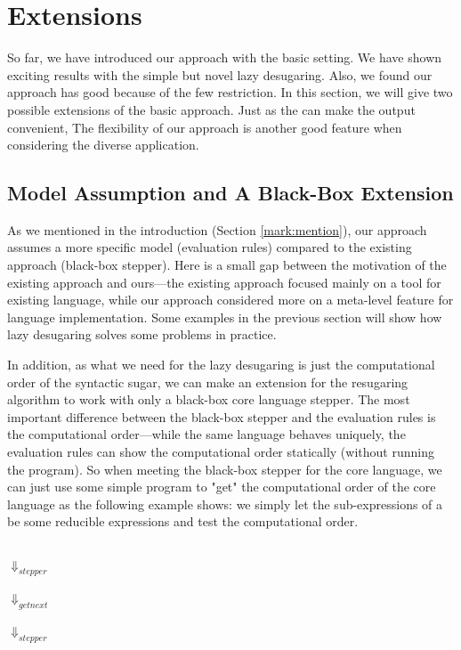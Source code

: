 \section{Extensions}
\label{sec:ext}

So far, we have introduced our approach with the basic setting. We have shown exciting results with the simple but novel lazy desugaring. Also, we found our approach has good because of the few restriction. In this section, we will give two possible extensions of the basic approach. Just as the  can make the output convenient, The flexibility of our approach is another good feature when considering the diverse application.

\subsection{Model Assumption and A Black-Box Extension}


As we mentioned in the introduction (Section \ref{mark:mention}), our approach assumes a more specific model (evaluation rules) compared to the existing approach (black-box stepper). Here is a small gap between the motivation of the existing approach and ours---the existing approach focused mainly on a tool for existing language, while our approach considered more on a meta-level feature for language implementation. Some examples in the previous section will show how lazy desugaring solves some problems in practice.

In addition, as what we need for the lazy desugaring is just the computational order of the syntactic sugar, we can make an extension for the resugaring algorithm to work with only a black-box core language stepper. The most important difference between the black-box stepper and the evaluation rules is the computational order---while the same language behaves uniquely, the evaluation rules can show the computational order statically (without running the program). So when meeting the black-box stepper for the core language, we can just use some simple program to "get" the computational order of the core language as the following example shows: we simply let the sub-expressions of a  be some reducible expressions and test the computational order.

\begin{center}
	\\ $\Downarrow_{stepper}$\\  \\ $\Downarrow_{getnext}$\\ \\ $\Downarrow_{stepper}$\\ \qquad{}\\
\end{center}



